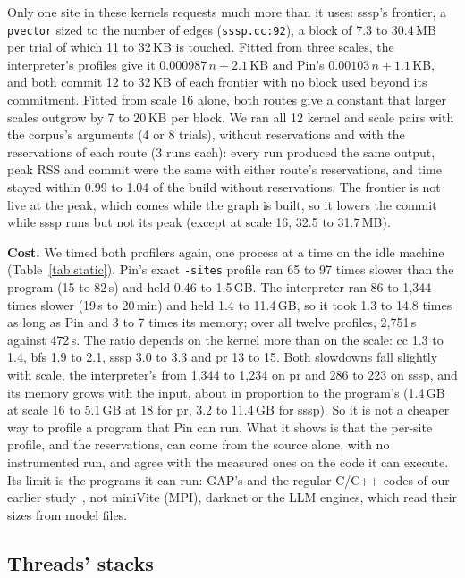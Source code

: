 \documentclass[11pt]{article}
\newcommand{\tabref}[1]{Table~\ref{#1}}
\begin{document}
Only one site in these kernels requests much more than it uses: sssp's frontier, a \texttt{pvector} sized to the number of edges
(\texttt{sssp.cc:92}), a block of 7.3 to 30.4\,MB per trial of which 11 to 32\,KB is
touched. Fitted from three scales, the interpreter's profiles give it $0.000987\,n + 2.1$\,KB and Pin's
$0.00103\,n + 1.1$\,KB, and both commit 12 to 32\,KB of each frontier with no block used beyond its commitment.
Fitted from scale 16 alone, both routes give a constant that larger scales outgrow by 7 to 20\,KB per block. We ran all 12 kernel and scale pairs
with the corpus's arguments (4 or 8 trials), without reservations and with the reservations of each route (3 runs
each): every run produced the same output, peak RSS and commit were the same with either route's reservations,
and time stayed within 0.99 to 1.04 of the build without reservations. The frontier is not live at the peak, which
comes while the graph is built, so it lowers the commit while sssp runs but not its peak (except at scale 16, 32.5
to 31.7\,MB).

\textbf{Cost.} We timed both profilers again, one process at a time on the idle machine (\tabref{tab:static}). Pin's
exact \texttt{-sites} profile ran 65 to 97 times slower than the program (15 to 82\,s) and held 0.46 to 1.5\,GB.
The interpreter ran 86 to 1{,}344 times slower (19\,s to 20\,min) and held 1.4 to 11.4\,GB, so it took 1.3 to 14.8
times as long as Pin and 3 to 7 times its memory; over all twelve profiles, 2{,}751\,s against 472\,s. The ratio
depends on the kernel more than on the scale: cc 1.3 to 1.4, bfs 1.9 to 2.1, sssp 3.0 to 3.3 and pr 13 to 15. Both slowdowns fall slightly with scale, the
interpreter's from 1{,}344 to 1{,}234 on pr and 286 to 223 on sssp, and its memory grows with the input, about in
proportion to the program's (1.4\,GB at scale 16 to 5.1\,GB at 18 for pr, 3.2 to 11.4\,GB for sssp). So it
is not a cheaper way to profile a program that Pin can run. What it shows is that the per-site profile, and the
reservations, can come from the source alone, with no instrumented run, and agree with the measured ones on the
code it can execute. Its limit is the programs it can run: GAP's and the regular C/C++ codes of our earlier study~\cite{memprintstatic}, not miniVite
(MPI), darknet or the LLM engines, which read their sizes from model files.

\subsection{Threads' stacks}
\end{document}

